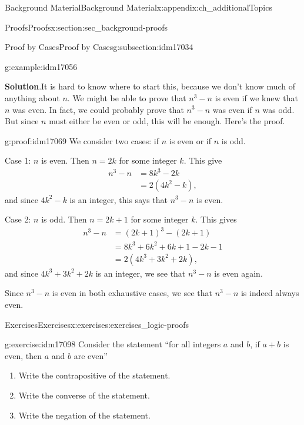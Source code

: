 \documentclass[oneside,10pt,]{book}
\numberwithin{equation}{chapter}
\newcommand{\amp}{&}
\begin{document}
\begin{appendixptx}{Background Material}{}{Background Material}{}{}{x:appendix:ch_additionalTopics}
\begin{sectionptx}{Proofs}{}{Proofs}{}{}{x:section:sec_background-proofs}
\begin{subsectionptx}{Proof by Cases}{}{Proof by Cases}{}{}{g:subsection:idm17034}
\begin{example}{}{g:example:idm17056}
\par\smallskip%
\noindent\textbf{Solution}.\hypertarget{g:solution:idm17061}{}\quad{}It is hard to know where to start this, because we don't know much of anything about \(n\). We might be able to prove that \(n^3 - n\) is even if we knew that \(n\) was even. In fact, we could probably prove that \(n^3-n\) was even if \(n\) was odd. But since \(n\) must either be even or odd, this will be enough. Here's the proof.%
\begin{proofptx}{}{g:proof:idm17069}
We consider two cases: if \(n\) is even or if \(n\) is odd.%
\par
Case 1: \(n\) is even. Then \(n = 2k\) for some integer \(k\). This give%
\begin{align*}
n^3 - n \amp = 8k^3 - 2k\\
\amp = 2(4k^2 - k),
\end{align*}
and since \(4k^2 - k\) is an integer, this says that \(n^3-n\) is even.%
\par
Case 2: \(n\) is odd. Then \(n = 2k+1\) for some integer \(k\). This gives%
\begin{align*}
n^3 - n \amp = (2k+1)^3 - (2k+1)\\
\amp = 8k^3 + 6k^2 + 6k + 1 - 2k - 1\\
\amp = 2(4k^3 + 3k^2 + 2k),
\end{align*}
and since \(4k^3 + 3k^2 + 2k\) is an integer, we see that \(n^3 - n\) is even again.%
\par
Since \(n^3 - n\) is even in both exhaustive cases, we see that \(n^3 - n\) is indeed always even.%
\end{proofptx}
\end{example}
\end{subsectionptx}
%
%
\typeout{************************************************}
\typeout{************************************************}
%
\begin{exercises-subsection}{Exercises}{}{Exercises}{}{}{x:exercises:exercises_logic-proofs}
\begin{divisionexercise}{1}{}{}{g:exercise:idm17098}%
Consider the statement ``for all integers \(a\) and \(b\), if \(a + b\) is even, then \(a\) and \(b\) are even''%
\par
%
\begin{enumerate}[label=(\alph*)]
\item{}Write the contrapositive of the statement.%
\item{}Write the converse of the statement.%
\item{}Write the negation of the statement.%

\end{enumerate}
\end{divisionexercise}
\end{exercises-subsection}
\end{sectionptx}
\end{appendixptx}
\end{document}
